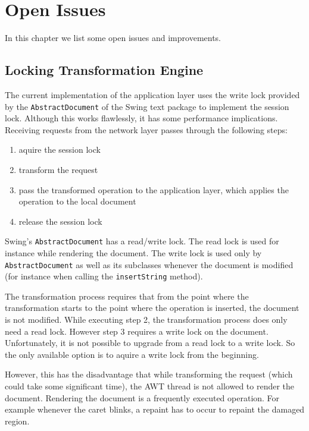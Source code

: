 \chapter{Open Issues}
\label{chapter:openissues}

In this chapter we list some open issues and improvements.


\section{Locking Transformation Engine}
The current implementation of the application layer uses the write lock
provided by the \texttt{Abstract\-Document} of the Swing 
text package to implement the session lock. 
Although this works flawlessly, it has some performance
implications. Receiving requests from the network layer passes through
the following steps:

\begin{enumerate}
 \item aquire the session lock
 \item transform the request
 \item pass the transformed operation to the application layer, which applies
       the operation to the local document
 \item release the session lock
\end{enumerate}

Swing's \texttt{Abstract\-Document} has a read/write lock. The read lock
is used for instance while rendering the document. The write lock is used
only by \texttt{Abstract\-Document} as well as its subclasses whenever the
document is modified (for instance when calling the \texttt{insert\-String}
method).

The transformation process requires that from the point where the transformation
starts to the point where the operation is inserted, the document is not 
modified. While executing step 2, the transformation process does only
need a read lock. However step 3 requires a write lock on the document.
Unfortunately, it is not possible to upgrade from a read lock to a write
lock. So the only available option is to aquire a write lock from the
beginning.

However, this has the disadvantage that while transforming
the request (which could take some significant time), the AWT thread is
not allowed to render the document. Rendering the document is a 
frequently executed operation. For example whenever the caret blinks, a
repaint has to occur to repaint the damaged region.

